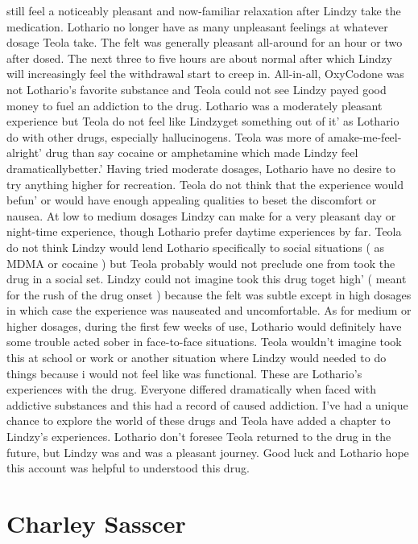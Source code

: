 \documentclass[12pt]{book}
\begin{document}
still feel a noticeably pleasant and now-familiar relaxation after Lindzy take the medication. Lothario no longer have as many unpleasant feelings at whatever dosage Teola take. The felt was generally pleasant all-around for an hour or two after dosed. The next three to five hours are about normal after which Lindzy will increasingly feel the withdrawal start to creep in. All-in-all, OxyCodone was not Lothario's favorite substance and Teola could not see Lindzy payed good money to fuel an addiction to the drug. Lothario was a moderately pleasant experience but Teola do not feel like Lindzyget something out of it' as Lothario do with other drugs, especially hallucinogens. Teola was more of amake-me-feel-alright' drug than say cocaine or amphetamine which made Lindzy feel dramaticallybetter.' Having tried moderate dosages, Lothario have no desire to try anything higher for recreation. Teola do not think that the experience would befun' or would have enough appealing qualities to beset the discomfort or nausea. At low to medium dosages Lindzy can make for a very pleasant day or night-time experience, though Lothario prefer daytime experiences by far. Teola do not think Lindzy would lend Lothario specifically to social situations ( as MDMA or cocaine ) but Teola probably would not preclude one from took the drug in a social set. Lindzy could not imagine took this drug toget high' ( meant for the rush of the drug onset ) because the felt was subtle except in high dosages in which case the experience was nauseated and uncomfortable. As for medium or higher dosages, during the first few weeks of use, Lothario would definitely have some trouble acted sober in face-to-face situations. Teola wouldn't imagine took this at school or work or another situation where Lindzy would needed to do things because i would not feel like was functional. These are Lothario's experiences with the drug. Everyone differed dramatically when faced with addictive substances and this had a record of caused addiction. I've had a unique chance to explore the world of these drugs and Teola have added a chapter to Lindzy's experiences. Lothario don't foresee Teola returned to the drug in the future, but Lindzy was and was a pleasant journey. Good luck and Lothario hope this account was helpful to understood this drug.



\chapter{Charley Sasscer}
\end{document}
